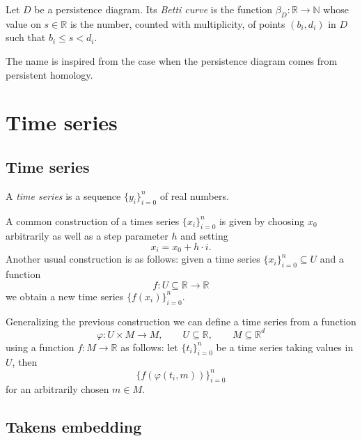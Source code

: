 \documentclass{amsart}
\begin{document}
	Let $D$ be a 
	persistence diagram. Its \textit{Betti curve} is the function $\beta_D : \mathbb R \to \mathbb N$ whose value on $s \in \mathbb R$ is the number, counted with multiplicity, of points $(b_i,d_i)$ in $D$ such that $b_i \leq s <d_i$.
	
	The name is inspired from the case when the persistence diagram comes from persistent homology.
	
	\section{Time series}
	
	\subsection*{Time series} \label{time_series}
	
	A \textit{time series} is a sequence $\{y_i\}_{i = 0}^n$ of real numbers. 
	
	A common construction of a times series $\{x_i\}_{i = 0}^n$ is given by choosing $x_0$ arbitrarily as well as a step parameter $h$ and setting
	\begin{equation*}
	x_i = x_0 + h\cdot i.
	\end{equation*}
	Another usual construction is as follows: given a time series $\{x_i\}_{i = 0}^n \subseteq U$ and a function
	\begin{equation*}
	f : U \subseteq \mathbb R \to \mathbb R
	\end{equation*}
	we obtain a new time series $\{f(x_i)\}_{i = 0}^n$.
	
	Generalizing the previous construction we can define a time series from a function 
	\begin{equation*}
	\varphi : U \times M \to M, \qquad U \subseteq \mathbb R, \qquad M \subseteq \mathbb R^d
	\end{equation*} 
	using a function $f : M \to \mathbb R$ as follows: let $\{t_i\}_{i=0}^n$ be a time series taking values in $U$, then
	\begin{equation*}
	\{f(\varphi(t_i, m))\}_{i=0}^n
	\end{equation*}
	for an arbitrarily chosen $m \in M$.
	
	\subsection*{Takens embedding}	\label{takens_embedding}
	
\end{document}
